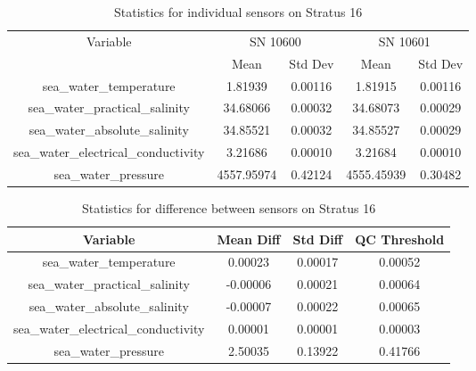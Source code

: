 \begin{table}[h]
\centering
\begin{tabular}{|c|c|c|c|c|}
\hline
Variable & \multicolumn{2}{c|}{SN 10600} & \multicolumn{2}{c|}{SN 10601} \\
& Mean & Std Dev & Mean & Std Dev \\
\hline
sea\_water\_temperature & 1.81939 & 0.00116 & 1.81915 & 0.00116 \\
sea\_water\_practical\_salinity & 34.68066 & 0.00032 & 34.68073 & 0.00029 \\
sea\_water\_absolute\_salinity & 34.85521 & 0.00032 & 34.85527 & 0.00029 \\
sea\_water\_electrical\_conductivity & 3.21686 & 0.00010 & 3.21684 & 0.00010 \\
sea\_water\_pressure & 4557.95974 & 0.42124 & 4555.45939 & 0.30482 \\
\hline
\end{tabular}
\caption{Statistics for individual sensors on Stratus 16}
\end{table}

\begin{table}[h]
\centering
\begin{tabular}{|c|c|c|c|}
\hline
Variable & Mean Diff & Std Diff & QC Threshold \\
\hline
sea\_water\_temperature & 0.00023 & 0.00017 & 0.00052 \\
sea\_water\_practical\_salinity & -0.00006 & 0.00021 & 0.00064 \\
sea\_water\_absolute\_salinity & -0.00007 & 0.00022 & 0.00065 \\
sea\_water\_electrical\_conductivity & 0.00001 & 0.00001 & 0.00003 \\
sea\_water\_pressure & 2.50035 & 0.13922 & 0.41766 \\
\hline
\end{tabular}
\caption{Statistics for difference between sensors on Stratus 16}
\end{table}
